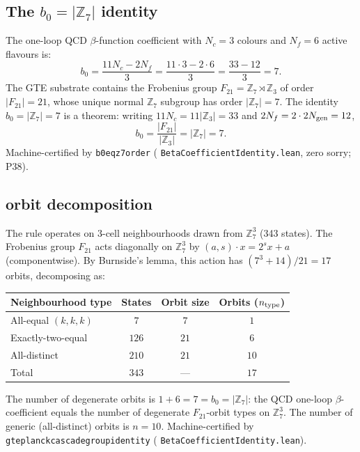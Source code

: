 \documentclass[11pt,openany]{book}
\theoremstyle{remark}
\newcommand{\ZS}{\mathbb{Z}_7}
\newcommand{\lean}[1]{%
  \penalty-100
  \begingroup\def\_{\textunderscore\allowbreak}\texttt{#1}\endgroup}
\newcommand{\CMCA}{\text{CMCA}}
\begin{document}
\subsection*{The $b_0 = |\ZS|$ identity}

The one-loop QCD $\beta$-function coefficient with $N_c = 3$ colours and
$N_f = 6$ active flavours is:
\begin{equation}
  b_0 = \frac{11N_c - 2N_f}{3}
      = \frac{11\cdot3 - 2\cdot6}{3}
      = \frac{33-12}{3} = 7.
  \label{eq:b0}
\end{equation}
The GTE substrate contains the Frobenius group
$F_{21} = \ZS \rtimes \mathbb{Z}_3$ of order $|F_{21}| = 21$,
whose unique normal $\ZS$ subgroup has order $|\ZS| = 7$.
The identity $b_0 = |\ZS| = 7$ is a theorem:
writing $11N_c = 11|\mathbb{Z}_3| = 33$ and $2N_f = 2\cdot2N_{\rm gen} = 12$,
\[
  b_0 = \frac{|F_{21}|}{|\mathbb{Z}_3|} = |\ZS| = 7.
\]
Machine-certified by \lean{b0\_eq\_z7\_order}
(\lean{BetaCoefficientIdentity.lean}, zero sorry; P38).

\subsection*{\CMCA{} orbit decomposition}

The \CMCA{} rule operates on 3-cell neighbourhoods drawn from $\ZS^3$ (343 states).
The Frobenius group $F_{21}$ acts diagonally on $\ZS^3$ by
$(a,s)\cdot x = 2^s x + a$ (componentwise).
By Burnside's lemma, this action has $(7^3 + 14)/21 = 17$ orbits, decomposing as:

\begin{center}
\renewcommand{\arraystretch}{1.2}
\begin{tabular}{lccc}
\toprule
Neighbourhood type & States & Orbit size & Orbits ($n_{\rm type}$) \\
\midrule
All-equal $(k,k,k)$ & $7$ & $7$ & $1$ \\
Exactly-two-equal & $126$ & $21$ & $6$ \\
All-distinct & $210$ & $21$ & $10$ \\
\midrule
Total & $343$ & --- & $17$ \\
\bottomrule
\end{tabular}
\end{center}

The number of degenerate orbits is $1 + 6 = 7 = b_0 = |\ZS|$: the QCD one-loop
$\beta$-coefficient equals the number of degenerate $F_{21}$-orbit types on $\ZS^3$.
The number of generic (all-distinct) orbits is $n = 10$.
Machine-certified by \lean{gte\_planck\_cascade\_group\_identity}
(\lean{BetaCoefficientIdentity.lean}).
\end{document}
